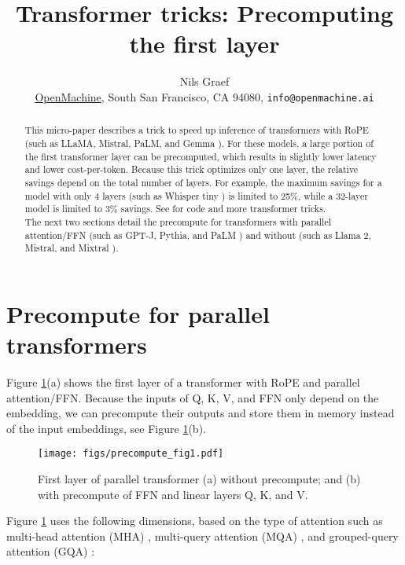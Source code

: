 \documentclass{article}
\title{Transformer tricks: Precomputing the first layer}
\author{Nils Graef \\ \href{https://openmachine.ai}{OpenMachine},
  South San Francisco, CA 94080, \texttt{info@openmachine.ai}}
\begin{document}
 \maketitle

\begin{abstract}
This micro-paper \cite{micro-paper} describes a trick to speed up inference of transformers with RoPE \citep{RoPE} (such as LLaMA, Mistral, PaLM, and Gemma \citep{gemma}). For these models, a large portion of the first transformer layer can be precomputed, which results in slightly lower latency and lower cost-per-token.
Because this trick optimizes only one layer, the relative savings depend on the total number of layers. For example, the maximum savings for a model with only 4 layers (such as Whisper tiny \citep{Whisper}) is limited to 25\%, while a 32-layer model is limited to 3\% savings. See \citep{tricks} for code and more transformer tricks. \\
The next two sections detail the precompute for transformers with parallel attention/FFN \citep{parallel} (such as GPT-J, Pythia, and PaLM \citep{parallel, Pythia, PaLM}) and without (such as Llama 2, Mistral, and Mixtral \citep{LLaMA, Llama2, Mistral, Mixtral}).
\end{abstract}

\section{Precompute for parallel transformers}
Figure \ref{fig1}(a) shows the first layer of a transformer with RoPE and parallel attention/FFN. Because the inputs of Q, K, V, and FFN only depend on the embedding, we can precompute their outputs and store them in memory instead of the input embeddings, see Figure \ref{fig1}(b).

\begin{figure}[h!] \centering  %
  \texttt{[image: figs/precompute\_fig1.pdf]}
  \caption{First layer of parallel transformer (a) without precompute; and (b) with precompute of FFN and linear layers Q, K, and V.}
\label{fig1} \end{figure}

Figure \ref{fig1} uses the following dimensions, based on the type of attention such as multi-head attention (MHA) \citep{vanilla}, multi-query attention (MQA) \citep{MQA}, and grouped-query attention (GQA) \citep{GQA}:
\end{document}
